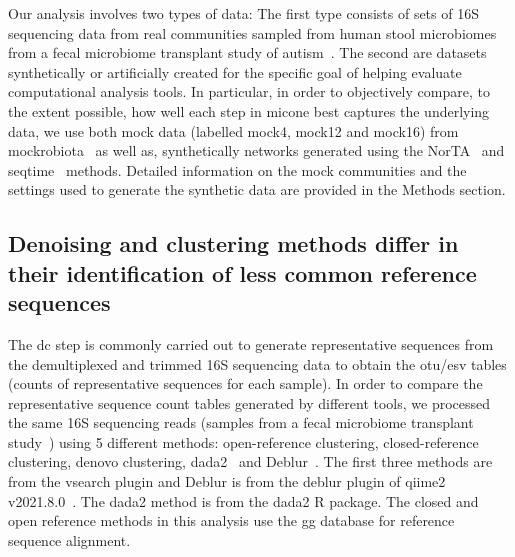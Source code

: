  Our analysis involves two types of data: The first type consists of sets of 16S sequencing data from real communities sampled from human stool microbiomes from a fecal microbiome transplant study of autism~\cite{Kang2017}.
  The second are datasets synthetically or artificially created for the specific goal of helping evaluate computational analysis tools.
  In particular, in order to objectively compare, to the extent possible, how well each step in \ac{micone} best captures the underlying data, we use both mock data (labelled mock4, mock12 and mock16) from mockrobiota~\cite{Bokulich2016} as well as, synthetically networks generated using the NorTA~\cite{Kurtz2015} and seqtime~\cite{Rottjers2018} methods.
  Detailed information on the mock communities and the settings used to generate the synthetic data are provided in the Methods section.

  \FloatBarrier

  \subsection*{Denoising and clustering methods differ in their identification of less common reference sequences}

  The \ac{dc} step is commonly carried out to generate representative sequences from the demultiplexed and trimmed 16S sequencing data to obtain the \ac{otu}/\ac{esv} tables (counts of representative sequences for each sample).
  In order to compare the representative sequence count tables generated by different tools, we processed the same 16S sequencing reads (samples from a fecal microbiome transplant study~\cite{Kang2017}) using 5 different methods: open-reference clustering, closed-reference clustering, denovo clustering, \ac{dada2}~\cite{Callahan2016} and Deblur~\cite{Amir2017}.
  The first three methods are from the vsearch plugin and Deblur is from the deblur plugin of \ac{qiime2} v2021.8.0~\cite{bolyenReproducibleInteractiveScalable2019}.
  The \ac{dada2} method is from the \ac{dada2} R package.
  The closed and open reference methods in this analysis use the \ac{gg} database for reference sequence alignment.


